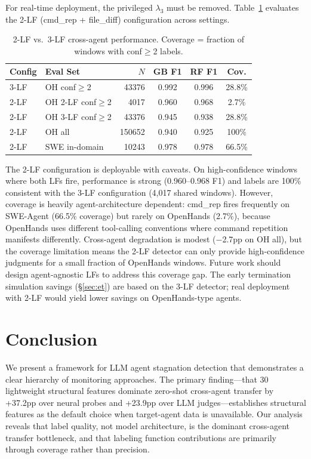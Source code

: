 \documentclass[11pt,a4paper]{article}
\begin{document}
For real-time deployment, the privileged $\lambda_3$ must be removed. Table~\ref{tab:2lf} evaluates the 2-LF (cmd\_rep + file\_diff) configuration across settings.

\begin{table}[t]
\centering
\small
\caption{2-LF vs.\ 3-LF cross-agent performance. Coverage = fraction of windows with conf$\geq$2 labels.}
\label{tab:2lf}
\begin{tabular}{llrccc}
\toprule
\textbf{Config} & \textbf{Eval Set} & \textbf{$N$} & \textbf{GB F1} & \textbf{RF F1} & \textbf{Cov.} \\
\midrule
3-LF & OH conf$\geq$2 & 43376 & 0.992 & 0.996 & 28.8\% \\
2-LF & OH 2-LF conf$\geq$2 & 4017 & 0.960 & 0.968 & 2.7\% \\
2-LF & OH 3-LF conf$\geq$2 & 43376 & 0.945 & 0.938 & 28.8\% \\
2-LF & OH all & 150652 & 0.940 & 0.925 & 100\% \\
2-LF & SWE in-domain & 10243 & 0.978 & 0.978 & 66.5\% \\
\bottomrule
\end{tabular}
\vspace{-2mm}
\end{table}

The 2-LF configuration is deployable with caveats. On high-confidence windows where both LFs fire, performance is strong (0.960--0.968 F1) and labels are 100\% consistent with the 3-LF configuration (4,017 shared windows). However, coverage is heavily agent-architecture dependent: cmd\_rep fires frequently on SWE-Agent (66.5\% coverage) but rarely on OpenHands (2.7\%), because OpenHands uses different tool-calling conventions where command repetition manifests differently. Cross-agent degradation is modest ($-$2.7pp on OH all), but the coverage limitation means the 2-LF detector can only provide high-confidence judgments for a small fraction of OpenHands windows. Future work should design agent-agnostic LFs to address this coverage gap. The early termination simulation savings (\S\ref{sec:et}) are based on the 3-LF detector; real deployment with 2-LF would yield lower savings on OpenHands-type agents.

\section{Conclusion}
\label{sec:conclusion}

We present a framework for LLM agent stagnation detection that demonstrates a clear hierarchy of monitoring approaches. The primary finding---that 30 lightweight structural features dominate zero-shot cross-agent transfer by +37.2pp over neural probes and +23.9pp over LLM judges---establishes structural features as the default choice when target-agent data is unavailable. Our analysis reveals that label quality, not model architecture, is the dominant cross-agent transfer bottleneck, and that labeling function contributions are primarily through coverage rather than precision.
\end{document}
